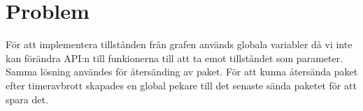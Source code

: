\section{Problem}
För att implementera tillstånden från grafen används globala variabler då vi inte kan förändra API:n till funkionerna till att ta emot tillståndet som parameter.
Samma lösning användes för återsänding av paket. För att kunna återsända paket efter timeravbrott skapades en global pekare till det senaste sända paketet för att spara det.
